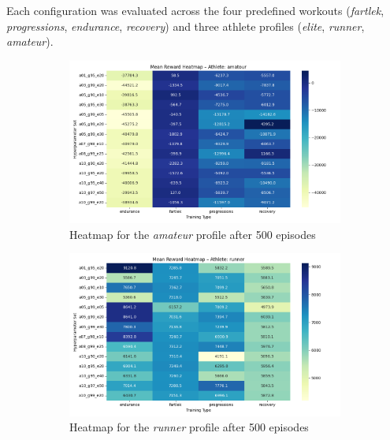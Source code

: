 Each configuration was evaluated across the four predefined workouts (\textit{fartlek}, \textit{progressions}, \textit{endurance}, \textit{recovery}) and three athlete profiles (\textit{elite}, \textit{runner}, \textit{amateur}).

\begin{figure}
    \centering
    \begin{subfigure}[t]{0.75\textwidth}
        \centering
        \includegraphics[width=\textwidth]{images/analysis_outputs_500/heatmap_amatour_500.png}
      \caption{Heatmap for the \textit{amateur} profile after 500 episodes}
    \label{fig:amateur-500}
    \end{subfigure}
    \begin{subfigure}[t]{0.75\textwidth}
        \centering
        \includegraphics[width=\textwidth]{images/analysis_outputs_500/heatmap_runner_500.png}
        \caption{Heatmap for the \textit{runner} profile after 500 episodes}
    \label{fig:runner-500}
    \end{subfigure}
    \begin{subfigure}[t]{0.75\textwidth}

\end{subfigure}
\end{figure}
